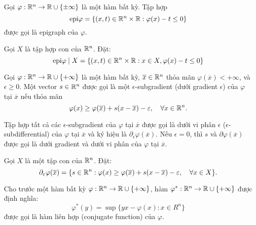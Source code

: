 \documentclass[a4paper]{report}
\begin{document}
    \begin{definition}
        \label{def:epigraph}
        Gọi $\varphi: \mathbb{R}^n \rightarrow \mathbb{R} \cup \{\pm \infty\}$ là một hàm bất kỳ. Tập hợp 
        \begin{equation}
            \label{eq:epi_graph}
            \text{epi}\varphi = \{(x, t) \in \mathbb{R}^n \times \mathbb{R}: \varphi(x) - t \leq 0\}
        \end{equation}
        được gọi là epigraph của $\varphi$.

        Gọi $X$ là tập hợp con của $\mathbb{R}^n$. Đặt:
        \begin{equation}
            \label{eq:epi_graph_set}
            \text{epi}\varphi\mid X = \{(x, t) \in \mathbb{R}^n \times \mathbb{R}: x \in X, \varphi(x) - t \leq 0\}
        \end{equation}
    \end{definition}

    \begin{definition}
        \label{def:epsilon_subgradient}
        Gọi $\varphi: \mathbb{R}^n \rightarrow \mathbb{R} \cup \{+ \infty\}$ là một hàm bất kỳ, $\overline{x} \in \mathbb{R}^n$ thỏa mãn $\varphi(\overline{x}) < +\infty$, và $\epsilon \geq 0$. Một vector $s \in \mathbb{R}^n$ được gọi là một $\epsilon$-subgradient (dưới gradient $\epsilon$) của $\varphi$ tại $\overline{x}$ nếu thỏa mãn
        \begin{equation}
            \label{eq:epsilon_subgradient_cond}
            \varphi(x) \geq \varphi(\overline{x}) + s(x - \overline{x}) - \varepsilon, \quad\forall x \in \mathbb{R}^n.
        \end{equation}
    \end{definition}
    Tập hợp tất cả các $\epsilon$-subgradient của $\varphi$ tại $\overline{x}$ được gọi là dưới vi phân $\epsilon$ ($\epsilon$-subdifferential) của $\varphi$ tại $\overline{x}$ và ký hiệu là $\partial_{\epsilon}\varphi(\overline{x})$. Nếu $\epsilon = 0$, thì $s$ và $\partial\varphi(\overline{x})$ được gọi là dưới gradient và dưới vi phân của $\varphi$ tại $\overline{x}$. 

    Gọi $X$ là một tập con của $\mathbb{R}^n$. Đặt:
    \begin{equation}
        \label{eq:subgradient_set}
        \partial_{\varepsilon}\varphi(\overline{x}) = \{
            s \in \mathbb{R}^n: \varphi(x) \geq \varphi(\overline{x}) + s(x - \overline{x}) - \varepsilon, \quad\forall x \in X
        \}.
    \end{equation}

    \begin{definition}
        \label{def:conjugate_function}
        Cho trước một hàm bất kỳ $\varphi: \mathbb{R}^n \rightarrow \mathbb{R} \cup \{+\infty\}$, hàm  $\varphi^*: \mathbb{R}^n \rightarrow \mathbb{R} \cup \{+\infty\}$ được định nghĩa:
        \begin{equation}
            \varphi^*(y) = \sup\{yx - \varphi(x): x \in R^n\}
        \end{equation}
        được gọi là hàm liên hợp (conjugate function) của $\varphi$.
    \end{definition}
\end{document}
